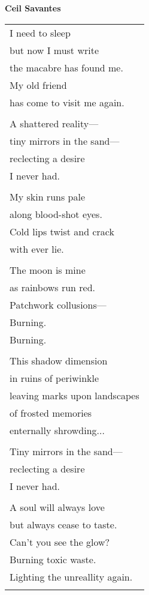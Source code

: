 \documentclass{article}
\begin{document}
\begin{center}
\textbf{Ceil Savantes} \\ %
\vspace*{1ex}
\begin{tabular}{l}
I need to sleep \\
but now I must write \\
the macabre has found me. \\
My old friend \\
has come to visit me again. \\
\\
A shattered reality--- \\
tiny mirrors in the sand--- \\
reclecting a desire \\
I never had. \\
\\
My skin runs pale \\
along blood-shot eyes. \\
Cold lips twist and crack \\
with ever lie. \\
\\
The moon is mine \\
as rainbows run red. \\
Patchwork collusions--- \\
Burning. \\
Burning. \\
\\
This shadow dimension \\
in ruins of periwinkle \\
leaving marks upon landscapes \\
of frosted memories \\
enternally shrowding... \\
\\
Tiny mirrors in the sand--- \\
reclecting a desire \\
I never had. \\
\\
A soul will always love \\
but always cease to taste. \\
Can't you see the glow? \\
Burning toxic waste. \\
Lighting the unreallity again. \\
\\

\end{tabular}
\end{center}
\end{document}
